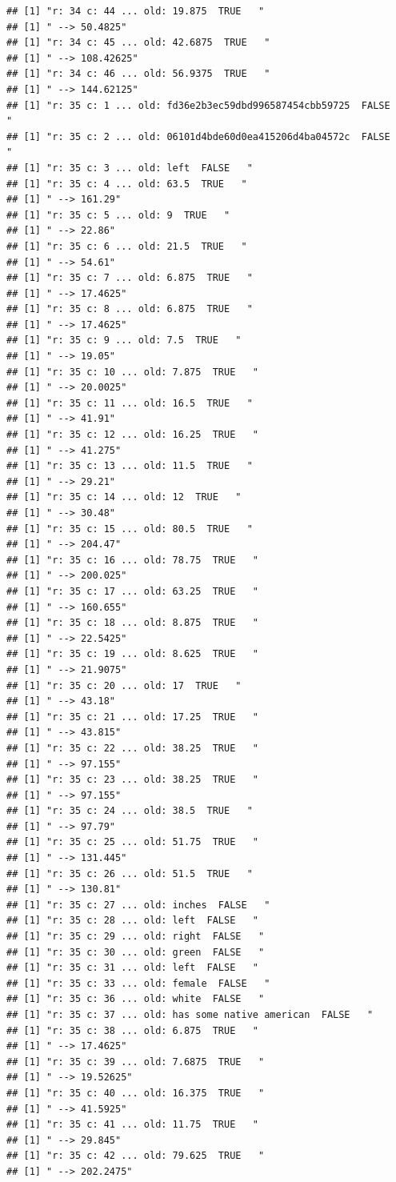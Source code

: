 \documentclass[]{article}
\begin{document}
\begin{verbatim}
## [1] "r: 34 c: 44 ... old: 19.875  TRUE   "
## [1] " --> 50.4825"
## [1] "r: 34 c: 45 ... old: 42.6875  TRUE   "
## [1] " --> 108.42625"
## [1] "r: 34 c: 46 ... old: 56.9375  TRUE   "
## [1] " --> 144.62125"
## [1] "r: 35 c: 1 ... old: fd36e2b3ec59dbd996587454cbb59725  FALSE   "
## [1] "r: 35 c: 2 ... old: 06101d4bde60d0ea415206d4ba04572c  FALSE   "
## [1] "r: 35 c: 3 ... old: left  FALSE   "
## [1] "r: 35 c: 4 ... old: 63.5  TRUE   "
## [1] " --> 161.29"
## [1] "r: 35 c: 5 ... old: 9  TRUE   "
## [1] " --> 22.86"
## [1] "r: 35 c: 6 ... old: 21.5  TRUE   "
## [1] " --> 54.61"
## [1] "r: 35 c: 7 ... old: 6.875  TRUE   "
## [1] " --> 17.4625"
## [1] "r: 35 c: 8 ... old: 6.875  TRUE   "
## [1] " --> 17.4625"
## [1] "r: 35 c: 9 ... old: 7.5  TRUE   "
## [1] " --> 19.05"
## [1] "r: 35 c: 10 ... old: 7.875  TRUE   "
## [1] " --> 20.0025"
## [1] "r: 35 c: 11 ... old: 16.5  TRUE   "
## [1] " --> 41.91"
## [1] "r: 35 c: 12 ... old: 16.25  TRUE   "
## [1] " --> 41.275"
## [1] "r: 35 c: 13 ... old: 11.5  TRUE   "
## [1] " --> 29.21"
## [1] "r: 35 c: 14 ... old: 12  TRUE   "
## [1] " --> 30.48"
## [1] "r: 35 c: 15 ... old: 80.5  TRUE   "
## [1] " --> 204.47"
## [1] "r: 35 c: 16 ... old: 78.75  TRUE   "
## [1] " --> 200.025"
## [1] "r: 35 c: 17 ... old: 63.25  TRUE   "
## [1] " --> 160.655"
## [1] "r: 35 c: 18 ... old: 8.875  TRUE   "
## [1] " --> 22.5425"
## [1] "r: 35 c: 19 ... old: 8.625  TRUE   "
## [1] " --> 21.9075"
## [1] "r: 35 c: 20 ... old: 17  TRUE   "
## [1] " --> 43.18"
## [1] "r: 35 c: 21 ... old: 17.25  TRUE   "
## [1] " --> 43.815"
## [1] "r: 35 c: 22 ... old: 38.25  TRUE   "
## [1] " --> 97.155"
## [1] "r: 35 c: 23 ... old: 38.25  TRUE   "
## [1] " --> 97.155"
## [1] "r: 35 c: 24 ... old: 38.5  TRUE   "
## [1] " --> 97.79"
## [1] "r: 35 c: 25 ... old: 51.75  TRUE   "
## [1] " --> 131.445"
## [1] "r: 35 c: 26 ... old: 51.5  TRUE   "
## [1] " --> 130.81"
## [1] "r: 35 c: 27 ... old: inches  FALSE   "
## [1] "r: 35 c: 28 ... old: left  FALSE   "
## [1] "r: 35 c: 29 ... old: right  FALSE   "
## [1] "r: 35 c: 30 ... old: green  FALSE   "
## [1] "r: 35 c: 31 ... old: left  FALSE   "
## [1] "r: 35 c: 33 ... old: female  FALSE   "
## [1] "r: 35 c: 36 ... old: white  FALSE   "
## [1] "r: 35 c: 37 ... old: has some native american  FALSE   "
## [1] "r: 35 c: 38 ... old: 6.875  TRUE   "
## [1] " --> 17.4625"
## [1] "r: 35 c: 39 ... old: 7.6875  TRUE   "
## [1] " --> 19.52625"
## [1] "r: 35 c: 40 ... old: 16.375  TRUE   "
## [1] " --> 41.5925"
## [1] "r: 35 c: 41 ... old: 11.75  TRUE   "
## [1] " --> 29.845"
## [1] "r: 35 c: 42 ... old: 79.625  TRUE   "
## [1] " --> 202.2475"

\end{verbatim}
\end{document}
